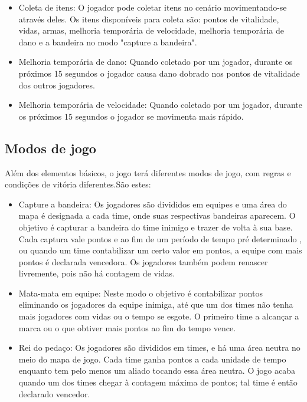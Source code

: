 \begin{itemize}
    \item Coleta de itens: O jogador pode coletar itens no cenário movimentando-se através deles. Os itens disponíveis para coleta são: pontos de vitalidade, vidas, armas, melhoria temporária de velocidade, melhoria temporária de dano e a bandeira no modo "capture a bandeira".
    \item Melhoria temporária de dano: Quando coletado por um jogador, durante os próximos 15 segundos o jogador causa dano dobrado nos pontos de vitalidade dos outros jogadores.
    \item Melhoria temporária de velocidade: Quando coletado por um jogador, durante os próximos 15 segundos o jogador se movimenta mais rápido. 
\end{itemize}

\subsection{Modos de jogo}\label{subsec:modosDeJogo}
Além dos elementos básicos, o jogo terá diferentes modos de jogo, com regras e condições de vitória diferentes.São estes:
\begin{itemize}
    \item Capture a bandeira: Os jogadores são divididos em equipes e uma área do mapa é designada a cada time, onde suas respectivas bandeiras aparecem. O objetivo é capturar a bandeira do time inimigo e trazer de volta à sua base. Cada captura vale pontos e ao fim de um período de tempo pré determinado , ou quando um time contabilizar um certo valor em pontos, a equipe com mais pontos é declarada vencedora. Os jogadores também podem renascer livremente, pois não há contagem de vidas. 
    \item Mata-mata em equipe: Neste modo o objetivo é contabilizar pontos eliminando os jogadores da equipe inimiga, até que um dos times não tenha mais jogadores com vidas ou o tempo se esgote. O primeiro time a alcançar a marca ou o que obtiver mais pontos ao fim do tempo vence.
    \item Rei do pedaço: Os jogadores são divididos em times, e há uma área neutra no meio do mapa de jogo. Cada time ganha pontos a cada unidade de tempo enquanto tem pelo menos um aliado tocando essa área neutra. O jogo acaba quando um dos times chegar à contagem máxima de pontos; tal time é então declarado vencedor.
\end{itemize}

